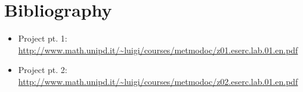 \renewcommand{\thesection}{A}
\section{Bibliography}
	\begin{itemize}
		\item Project pt. 1: {\color{blue}\url{http://www.math.unipd.it/~luigi/courses/metmodoc/z01.eserc.lab.01.en.pdf}}
		\item Project pt. 2: {\color{blue}\url{http://www.math.unipd.it/~luigi/courses/metmodoc/z02.eserc.lab.01.en.pdf}}
	\end{itemize}
	